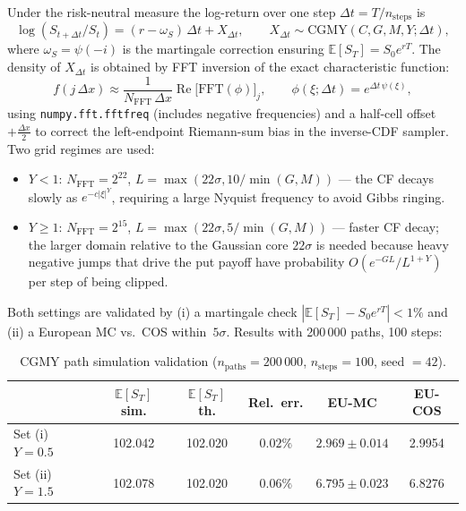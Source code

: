 \documentclass[11pt,a4paper]{article}
\begin{document}
Under the risk-neutral measure the log-return over one step
$\Delta t = T/n_{\mathrm{steps}}$ is
\begin{equation}
  \log(S_{t+\Delta t}/S_t) = (r - \omega_S)\,\Delta t + X_{\Delta t},
  \qquad
  X_{\Delta t} \sim \mathrm{CGMY}(C,G,M,Y;\Delta t),
\end{equation}
where $\omega_S = \psi(-i)$ is the martingale correction ensuring
$\mathbb{E}[S_T] = S_0 e^{rT}$.  The density of $X_{\Delta t}$ is obtained by
FFT inversion of the exact characteristic function:
\begin{equation}
  f(j\,\Delta x) \approx \frac{1}{N_{\mathrm{FFT}}\,\Delta x}
  \operatorname{Re}\!\bigl[\mathrm{FFT}(\phi)\bigr]_j,
  \qquad \phi(\xi;\Delta t) = e^{\Delta t\,\psi(\xi)},
\end{equation}
using \texttt{numpy.fft.fftfreq} (includes negative frequencies) and a
half-cell offset $+\tfrac{\Delta x}{2}$ to correct the left-endpoint
Riemann-sum bias in the inverse-CDF sampler.  Two grid regimes are used:
\begin{itemize}
  \item $Y < 1$: $N_{\mathrm{FFT}} = 2^{22}$,
    $L = \max(22\sigma, 10/\min(G,M))$ — the CF decays slowly as
    $e^{-c|\xi|^Y}$, requiring a large Nyquist frequency to avoid Gibbs ringing.
  \item $Y \geq 1$: $N_{\mathrm{FFT}} = 2^{15}$,
    $L = \max(22\sigma, 5/\min(G,M))$ — faster CF decay; the larger domain
    relative to the Gaussian core $22\sigma$ is needed because heavy negative
    jumps that drive the put payoff have probability $O(e^{-GL}/L^{1+Y})$ per
    step of being clipped.
\end{itemize}
Both settings are validated by (i) a martingale check
$|\mathbb{E}[S_T] - S_0 e^{rT}| < 1\%$ and (ii) a European MC vs.\ COS
within~$5\sigma$.  Results with 200\,000 paths, 100 steps:

\begin{table}[ht]
\centering
\caption{CGMY path simulation validation
  ($n_{\mathrm{paths}}=200\,000$, $n_{\mathrm{steps}}=100$, seed $=42$).}
\label{tab:mc_validation}
\begin{tabular}{lccccc}
\toprule
 & $\mathbb{E}[S_T]$ sim. & $\mathbb{E}[S_T]$ th. & Rel.\ err.
 & EU-MC & EU-COS \\
\midrule
Set (i) $Y=0.5$ & 102.042 & 102.020 & $0.02\%$ & $2.969\pm 0.014$ & 2.9954 \\
Set (ii) $Y=1.5$ & 102.078 & 102.020 & $0.06\%$ & $6.795\pm 0.023$ & 6.8276 \\
\bottomrule
\end{tabular}
\end{table}
\end{document}
